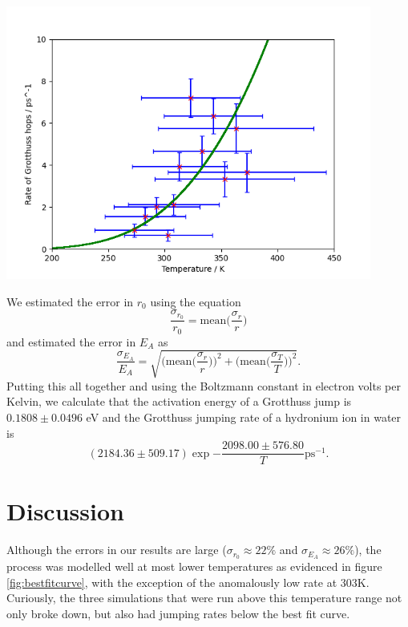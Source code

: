 \documentclass{article}
\newenvironment{Figure}{\par\medskip\noindent\minipage{\linewidth}}{\endminipage\par\medskip}
\begin{document}
\begin{multicols}{2}
\begin{Figure}
	\centering
	\includegraphics[width=0.9\textwidth]{figures/bestfitcurve.png}
	\label{fig:bestfitcurve}	
\end{Figure}
We estimated the error in  $r_0$ using the equation
\begin{equation}
	\frac{\sigma_{r_{0}}}{r_{0}}=\text{mean}\bigg(\frac{\sigma_{r}}{r}\bigg)
\end{equation}
and estimated the error in $E_{A}$ as 
\begin{equation}
	\frac{\sigma_{E_{A}}}{E_{A}}=\sqrt{\bigg(\text{mean}\bigg(\frac{\sigma_{r}}{r}\bigg)\bigg)^{2} + \bigg(\text{mean}\bigg(\frac{\sigma_{T}}{T}\bigg)\bigg)^{2}}.
\end{equation}
Putting this all together and using the Boltzmann constant in electron volts per Kelvin, we calculate that the activation energy of a Grotthuss jump is $0.1808\pm 0.0496$ eV and the Grotthuss jumping rate of a hydronium ion in water is 
\begin{equation}
	\label{eq:result}
	(2184.36 \pm 509.17)\exp{-\frac{2098.00 \pm 576.80}{T}} \text{ps}^{-1}.
\end{equation}
\section{Discussion}
Although the errors in our results are large ($\sigma_{r_{0}}\approx 22\%$ and $\sigma_{E_{A}}\approx 26\%$), the process was modelled well at most lower temperatures as evidenced in figure \ref{fig:bestfitcurve}, with the exception of the anomalously low rate at 303K. Curiously, the three simulations that were run above this temperature range not only broke down, but also had jumping rates below the best fit curve.


\end{multicols}
\end{document}
